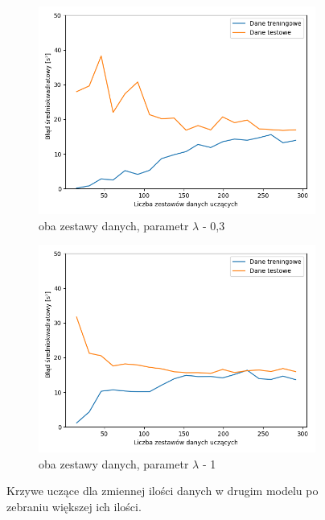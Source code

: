 \documentclass[12pt]{aghdpl}
\begin{document}
\begin{figure}[h]
		 	\begin{subfigure}{.5\linewidth}
		 		\includegraphics[width =\linewidth]{wykresy/8_zebranie_wiekszej_ilosci_danych/0-400/regularyzacja_0_3_learning_curves.png}
		 		\caption{oba zestawy danych, parametr $\lambda$ - 0,3}
		 	\end{subfigure}
		 	\begin{subfigure}{.5\linewidth}
		 		\includegraphics[width =\linewidth]{wykresy/8_zebranie_wiekszej_ilosci_danych/0-400/regularyzacja_1_learning_curves.png}
		 		\caption{oba zestawy danych, parametr $\lambda$ - 1}
		 	\end{subfigure}
	 	
 			\caption{Krzywe uczące dla zmiennej ilości danych w drugim modelu po zebraniu większej ich ilości.}
			\label{fig: drugi_model_po_zebraniu_wiekszej_ilosci_danych_learning_curves}
		\end{figure}
		
\end{document}
